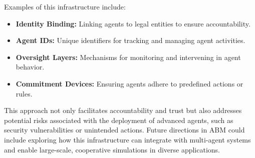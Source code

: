 Examples of this infrastructure include:
\begin{itemize}
    \item \textbf{Identity Binding:} Linking agents to legal entities to ensure accountability.
    \item \textbf{Agent IDs:} Unique identifiers for tracking and managing agent activities.
    \item \textbf{Oversight Layers:} Mechanisms for monitoring and intervening in agent behavior.
    \item \textbf{Commitment Devices:} Ensuring agents adhere to predefined actions or rules.
\end{itemize}

This approach not only facilitates accountability and trust but also addresses potential risks associated with the deployment of advanced agents, such as security vulnerabilities or unintended actions. Future directions in ABM could include exploring how this infrastructure can integrate with multi-agent systems and enable large-scale, cooperative simulations in diverse applications.



\listoffigures
\listoftables




